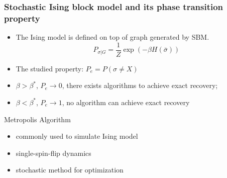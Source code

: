 \documentclass[notheorems]{beamer}
\begin{document}

\begin{frame}
	\frametitle{\large Stochastic Ising block model and its phase transition property}
\begin{itemize}
	\item The Ising model is defined on top of graph generated by SBM.
 	\begin{equation*}
 	P_{\sigma | G} = \frac{1}{Z} \exp(-\beta H(\bar{\sigma}))
 	\end{equation*}
	 \item The studied property: $P_e= P(\sigma \neq X)$
	 \item $\beta > \beta^*$, $P_e \to 0$, there exists algorithms to achieve exact recovery;
	\item $\beta < \beta^*$, $P_e \to 1$, no algorithm can achieve exact recovery
\end{itemize}
\begin{block}{Metropolis Algorithm}
 \begin{itemize}
 	\item commonly used to simulate Ising model
 	\item single-spin-flip dynamics
 	\item stochastic method for optimization
 \end{itemize}
\end{block}
	\end{frame}
	
\end{document}
